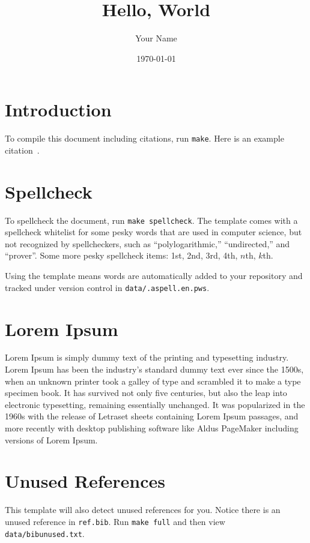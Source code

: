 \documentclass{article}
\title{Hello, World}
\author{Your Name}
\date{\today{}}
\begin{document}
\maketitle

\section{Introduction}

To compile this document including citations, run \texttt{make}.
Here is an example citation~\cite{knuth1997art}.

\section{Spellcheck}

To spellcheck the document, run \texttt{make spellcheck}.
The template comes with a spellcheck whitelist for some pesky words that
are used in computer science, but not recognized by spellcheckers, such as
``polylogarithmic,'' ``undirected,'' and ``prover''.
Some more pesky spellcheck items:
1st, 2nd, 3rd, 4th, $n$th, $k$th.

Using the template means words are automatically added to your repository and
tracked under version control in \texttt{data/.aspell.en.pws}.

\section{Lorem Ipsum}

Lorem Ipsum is simply dummy text of the printing and typesetting industry. Lorem Ipsum has been the industry's standard dummy text ever since the 1500s, when an unknown printer took a galley of type and scrambled it to make a type specimen book. It has survived not only five centuries, but also the leap into electronic typesetting, remaining essentially unchanged. It was popularized in the 1960s with the release of Letraset sheets containing Lorem Ipsum passages, and more recently with desktop publishing software like Aldus PageMaker including versions of Lorem Ipsum.

\section{Unused References}

This template will also detect unused references for you.
Notice there is an unused reference in \texttt{ref.bib}.
Run \texttt{make full} and then view \texttt{data/bibunused.txt}.
\end{document}
